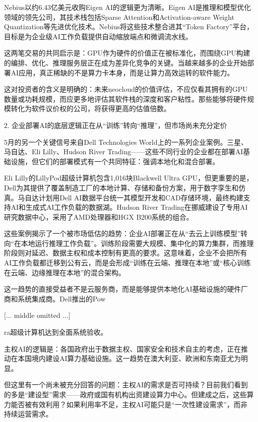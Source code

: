 \documentclass[11pt]{ctexart}
\begin{document}
Nebius以约6.43亿美元收购Eigen AI的逻辑更为清晰。Eigen AI是推理和模型优化领域的领先公司，其技术栈包括Sparse Attention和Activation-aware Weight Quantization等先进优化技术。Nebius将这些技术整合进其“Token Factory”平台，目标是为企业级AI工作负载提供自动缩放端点和微调流水线。

这两笔交易的共同启示是：GPU作为硬件的价值正在被标准化，而围绕GPU构建的编排、优化、推理服务层正在成为差异化竞争的关键。当越来越多的企业开始部署AI应用，真正稀缺的不是算力卡本身，而是让算力高效运转的软件能力。

这对投资者的含义是明确的：未来neocloud的价值评估，不应仅看其拥有的GPU数量或功耗规模，而应更多地评估其软件栈的深度和客户粘性。那些能够将硬件规模转化为软件议价权的公司，将获得更高的估值倍数。

2. 企业部署AI的底层逻辑正在从“训练”转向“推理”，但市场尚未充分定价

5月的另一个关键信号来自Dell Technologies World上的一系列企业案例。三星、马自达、Eli Lilly、Hudson River Trading——这些不同行业的企业都在部署AI基础设施，但它们的部署模式有一个共同特征：强调本地化和混合部署。

Eli Lilly的LillyPod超级计算机包含1,016块Blackwell Ultra GPU，但更重要的是，Dell为其提供了覆盖制造工厂的本地计算、存储和备份方案，用于数字孪生和仿真。马自达计划用Dell AI数据平台统一其模型开发和CAD存储环境，最终构建支持AI和生成式AI工作负载的数据湖。Hudson River Trading在挪威建设了专用AI研究数据中心，采用了AMD处理器和HGX B200系统的组合。

这些案例揭示了一个被市场低估的趋势：企业AI部署正在从“去云上训练模型”转向“在本地运行推理工作负载”。训练阶段需要大规模、集中化的算力集群，而推理阶段则对延迟、数据主权和成本控制有更高的要求。这意味着，企业不会把所有AI工作负载都迁移到公有云，而是会形成“训练在云端、推理在本地”或“核心训练在云端、边缘推理在本地”的混合架构。

这一趋势的直接受益者不是云服务商，而是能够提供本地化AI基础设施的硬件厂商和系统集成商。Dell推出的Pow

[... middle omitted ...]

ra超级计算机达到全面系统验收。

主权AI的逻辑是：各国政府出于数据主权、国家安全和技术自主的考虑，正在推动在本国境内建设AI算力基础设施。这一趋势在澳大利亚、欧洲和东南亚尤为明显。

但这里有一个尚未被充分回答的问题：主权AI的需求是否可持续？目前我们看到的多是“建设型”需求——政府或国有机构出资建设算力中心。但建成之后，这些算力能否被有效利用？如果利用率不足，主权AI可能只是“一次性建设需求”，而非持续运营需求。
\end{document}
